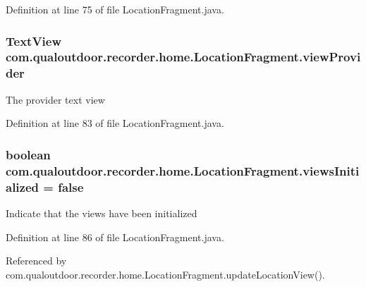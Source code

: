 Definition at line 75 of file Location\-Fragment.\-java.

\hypertarget{classcom_1_1qualoutdoor_1_1recorder_1_1home_1_1LocationFragment_aa6c46dd3c92b8c8efcd04584b44861bf}{
\subsubsection[{view\-Provider}]{\setlength{\rightskip}{0pt plus 5cm}Text\-View com.\-qualoutdoor.\-recorder.\-home.\-Location\-Fragment.\-view\-Provider\hspace{0.3cm}{\ttfamily [private]}}}\label{classcom_1_1qualoutdoor_1_1recorder_1_1home_1_1LocationFragment_aa6c46dd3c92b8c8efcd04584b44861bf}
The provider text view 

Definition at line 83 of file Location\-Fragment.\-java.

\hypertarget{classcom_1_1qualoutdoor_1_1recorder_1_1home_1_1LocationFragment_a0be3a20b70c9d223e91aa2ddf89b28d9}{
\subsubsection[{views\-Initialized}]{\setlength{\rightskip}{0pt plus 5cm}boolean com.\-qualoutdoor.\-recorder.\-home.\-Location\-Fragment.\-views\-Initialized = false\hspace{0.3cm}{\ttfamily [private]}}}\label{classcom_1_1qualoutdoor_1_1recorder_1_1home_1_1LocationFragment_a0be3a20b70c9d223e91aa2ddf89b28d9}
Indicate that the views have been initialized 

Definition at line 86 of file Location\-Fragment.\-java.



Referenced by com.\-qualoutdoor.\-recorder.\-home.\-Location\-Fragment.\-update\-Location\-View().

